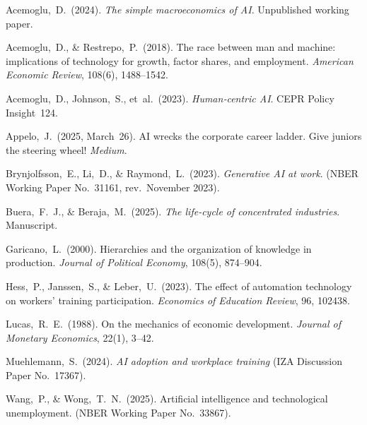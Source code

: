 \documentclass[12pt]{article}
\begin{document}
\begin{thebibliography}{}

Acemoglu,~D.\ (2024).
\newblock \emph{The simple macroeconomics of AI}.
\newblock Unpublished working paper.

Acemoglu,~D., \& Restrepo,~P.\ (2018).
\newblock The race between man and machine: implications of technology for growth, factor shares, and employment.
\newblock \emph{American Economic Review}, 108(6), 1488--1542.

Acemoglu,~D., Johnson,~S., et~al.\ (2023).
\newblock \emph{Human‐centric AI}.
\newblock CEPR Policy Insight~124.

Appelo,~J.\ (2025, March~26).
\newblock AI wrecks the corporate career ladder.  Give juniors the steering wheel!
\newblock \emph{Medium}.  

Brynjolfsson,~E., Li,~D., \& Raymond,~L.\ (2023).
\newblock \emph{Generative AI at work}.
\newblock (NBER Working Paper No.~31161, rev.\ November 2023).

Buera,~F.~J., \& Beraja,~M.\ (2025).
\newblock \emph{The life-cycle of concentrated industries}.
\newblock Manuscript.

Garicano,~L.\ (2000).
\newblock Hierarchies and the organization of knowledge in production.
\newblock \emph{Journal of Political Economy}, 108(5), 874--904.

Hess,~P., Janssen,~S., \& Leber,~U.\ (2023).
\newblock The effect of automation technology on workers’ training participation.
\newblock \emph{Economics of Education Review}, 96, 102438.

Lucas,~R.~E.\ (1988).
\newblock On the mechanics of economic development.
\newblock \emph{Journal of Monetary Economics}, 22(1), 3--42.

Muehlemann,~S.\ (2024).
\newblock \emph{AI adoption and workplace training} (IZA Discussion Paper No.~17367).

Wang,~P., \& Wong,~T.~N.\ (2025).
\newblock Artificial intelligence and technological unemployment.
\newblock (NBER Working Paper No.~33867).

\end{thebibliography}
\end{document}
